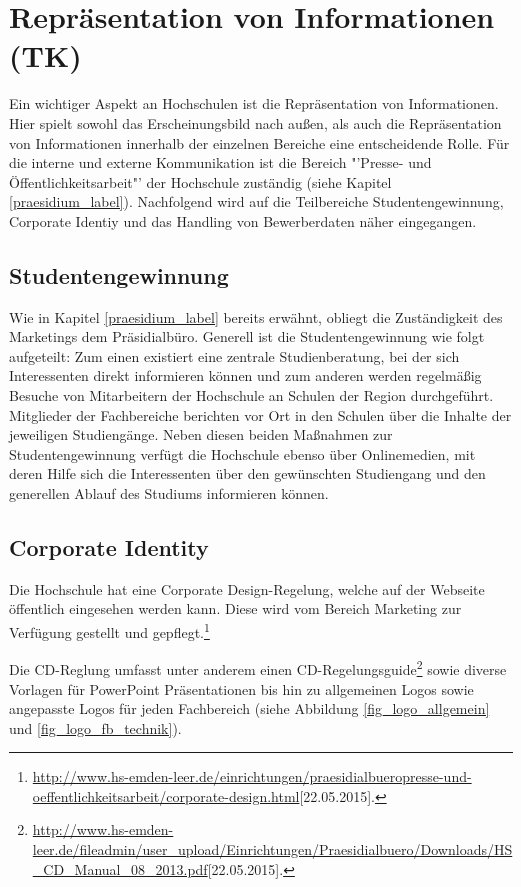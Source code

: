 \section{Repräsentation von Informationen (TK)}
Ein wichtiger Aspekt an Hochschulen ist die Repräsentation von Informationen. Hier spielt sowohl das Erscheinungsbild nach außen, als auch die Repräsentation von Informationen innerhalb der einzelnen Bereiche eine entscheidende Rolle. Für die interne und externe Kommunikation ist die Bereich "'Presse- und Öffentlichkeitsarbeit"' der Hochschule zuständig (siehe Kapitel \ref{praesidium_label}). Nachfolgend wird auf die Teilbereiche   Studentengewinnung, Corporate Identiy und das Handling von Bewerberdaten näher eingegangen.

\subsection{Studentengewinnung}
Wie in Kapitel \ref{praesidium_label} bereits erwähnt, obliegt die Zuständigkeit des Marketings dem Präsidialbüro. Generell ist die Studentengewinnung wie folgt aufgeteilt: Zum einen existiert eine zentrale Studienberatung, bei der sich Interessenten direkt informieren können und zum anderen werden regelmäßig Besuche von Mitarbeitern der Hochschule an Schulen der Region durchgeführt. Mitglieder der Fachbereiche berichten vor Ort in den Schulen über die Inhalte der jeweiligen Studiengänge. Neben diesen beiden Maßnahmen zur Studentengewinnung verfügt die Hochschule ebenso über Onlinemedien, mit deren Hilfe sich die Interessenten über den gewünschten Studiengang und den generellen Ablauf des  Studiums informieren können. 


\subsection{Corporate Identity}
Die Hochschule hat eine Corporate Design-Regelung, welche auf der Webseite öffentlich 
eingesehen werden kann. Diese wird vom Bereich Marketing zur Verfügung gestellt und 
gepflegt.\footnote{\url{http://www.hs-emden-leer.de/einrichtungen/praesidialbueropresse-und-oeffentlichkeitsarbeit/corporate-design.html}[22.05.2015].}

Die CD-Reglung umfasst unter anderem einen 
CD-Regelungsguide\footnote{\url{http://www.hs-emden-leer.de/fileadmin/user_upload/Einrichtungen/Praesidialbuero/Downloads/HS_CD_Manual_08_2013.pdf}[22.05.2015].} sowie 
diverse Vorlagen für PowerPoint Präsentationen bis hin zu allgemeinen Logos sowie 
angepasste Logos für jeden Fachbereich (siehe Abbildung \ref{fig_logo_allgemein} und 
\ref{fig_logo_fb_technik}).

